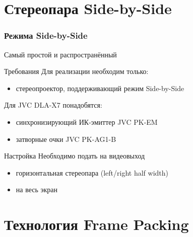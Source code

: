 \documentclass[ucs]{beamer}
\begin{document}
\section{Стереопара Side-by-Side}

\begin{frame}[fragile]
	\frametitle{Режима Side-by-Side}
	Самый простой и распространённый
	\begin{block}{Требования}
		Для реализации необходим только:
		\begin{itemize}
			\item стереопроектор, поддерживающий режим Side-by-Side \\	
		\end{itemize}
		Для JVC DLA-X7 понадобятся:
		\begin{itemize}
			\item синхронизирующий ИК-эмиттер JVC PK-EM \\
			\item затворные очки JVC PK-AG1-B \\
		\end{itemize}
	\end{block}
	\begin{block}{Настройка}
		Необходимо подать на видеовыход
		\begin{itemize}
			\item горизонтальная стереопара (left/right half width)
			\item на весь экран
		\end{itemize}
	\end{block}
\end{frame}

\section{Технология Frame Packing}
\end{document}
